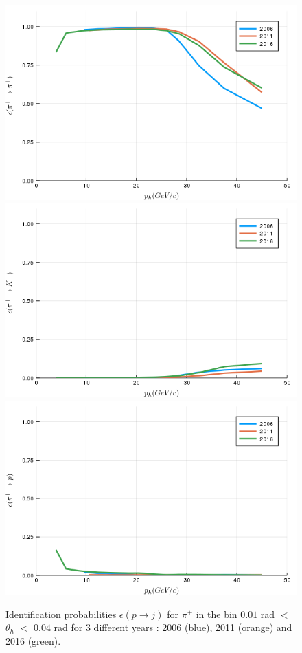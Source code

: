 \begin{figure}[!h]
  \centering
	\includegraphics[scale=0.35]{./gfx/t1/pip2pip.png}
  \includegraphics[scale=0.35]{./gfx/t1/pip2kp.png}
  \includegraphics[scale=0.35]{./gfx/t1/pip2pp.png}
	\caption{Identification probabilities $\epsilon(p \rightarrow j)$ for $\pi^+$ in the bin $0.01$ rad $<$ $\theta_h$ $<$ $0.04$ rad for 3 different years : 2006 (blue), 2011 (orange) and 2016 (green).}
	\label{pic:comppip}
\end{figure}

